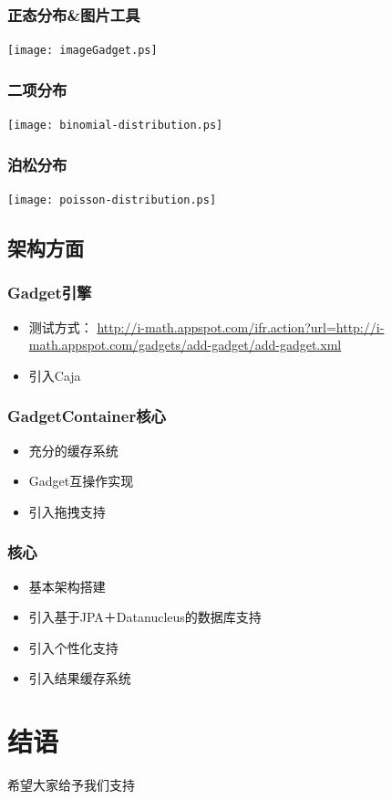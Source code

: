 \documentclass[dvipdfm,serif,mathserif]{beamer}
\begin{document}
\begin{frame}
  \frametitle{正态分布\&图片工具}
  \texttt{[image: imageGadget.ps]}
\end{frame}

\begin{frame}
  \frametitle{二项分布}
  \texttt{[image: binomial-distribution.ps]}
\end{frame}

\begin{frame}
  \frametitle{泊松分布}
  \texttt{[image: poisson-distribution.ps]}
\end{frame}


\subsection{架构方面}

\begin{frame}
  \frametitle{Gadget引擎}
\begin{itemize}
 \item 测试方式：
\href{http://i-math.appspot.com/ifr.action?url=http://i-math.appspot.com/gadgets/add-gadget/add-gadget.xml}{http://i-math.appspot.com/ifr.action?url=http://i-math.appspot.com/gadgets/add-gadget/add-gadget.xml}
\item 引入Caja
  \end{itemize}
\end{frame}

\begin{frame}
  \frametitle{GadgetContainer核心}
\begin{itemize}
 \item 充分的缓存系统
\item Gadget互操作实现
\item 引入拖拽支持
\end{itemize}
\end{frame}

\begin{frame}
  \frametitle{核心}
\begin{itemize}
\item 基本架构搭建
\item 引入基于JPA＋Datanucleus的数据库支持
\item 引入个性化支持
\item 引入结果缓存系统
\end{itemize}
\end{frame}

\section{结语}

\begin{frame}
\begin{center}
希望大家给予我们支持
\end{center}
\end{frame}
\end{document}
